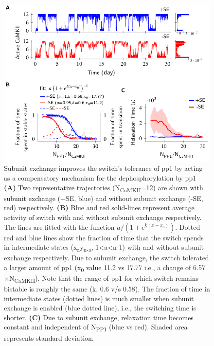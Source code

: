 \documentclass[9pt,lineno,doublespacing]{elife}
\newcommand\SUB[2]{#1\textsubscript{#2}}
\begin{document}
\begin{figure}[ht]
    \includegraphics[width=140mm]{PaperFigures/elifeFigure2/figure_effect_of_tolerace_140mm.pdf}
    \caption{Subunit exchange improves the switch's tolerance of \gls{pp1} by
        acting as a compensatory mechanism for the dephosphorylation by \gls{pp1} 
        \textbf{(A)} Two representative trajectories (\SUB{N}{CaMKII}=12) are
        shown with subunit exchange (+SE, blue) and without
        subunit exchange (-SE, red) respectively. \textbf{(B)} Blue and red
        solid-lines represent average activity of switch with and without 
        subunit exchange respectively. The lines are fitted with the 
        function \({a}/\left({1+e^{k(x-x_0)}}\right)\).
        Dotted red and blue lines show the fraction of time that the switch
        spends in intermediate states (\SUB{x}{a}\SUB{y}{n-a}, 1<a<n-1) with
        and without subunit exchange respectively. Due to subunit exchange,
        the switch tolerated a larger amount of \gls{pp1} 
        (\SUB{x}{0} value 11.2 vs 17.77 i.e., a change of 6.57$\times$\SUB{N}{CaMKII}).
        Note that the range of \gls{pp1} for which switch remains bistable is roughly the 
        same (k, 0.6 v/s 0.58). The fraction of time in intermediate states (dotted lines)
	is much smaller when subunit exchange is enabled (blue dotted line),
        i.e., the switching time is shorter. \textbf{(C)} Due to subunit exchange, relaxation 
        time becomes constant and independent of \SUB{N}{PP1} (blue vs red). 
        Shaded area represents standard deviation.
    }\label{fig:tolerance_pp1}
\end{figure}
\end{document}
